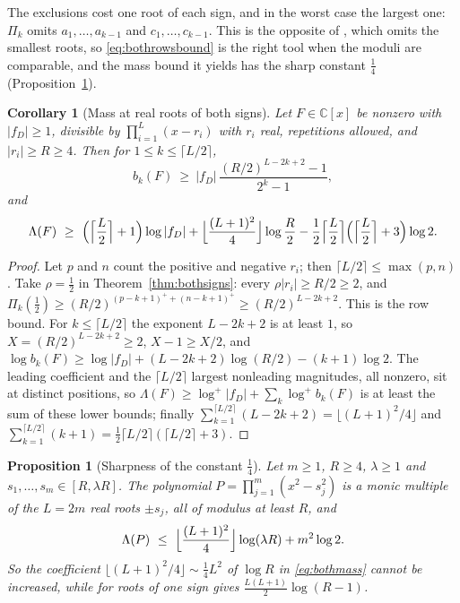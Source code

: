 \documentclass[11pt]{article}
\newtheorem{corollary}[theorem]{Corollary}
\newtheorem{proposition}[theorem]{Proposition}
\begin{document}
The exclusions cost one root of each sign, and in the worst case the largest
one: $\Pi_k$ omits $a_1,\ldots,a_{k-1}$ and $c_1,\ldots,c_{k-1}$.  This is the
opposite of \cite[Theorem~3.2]{coefficient-mass}, which omits the smallest roots, so
\eqref{eq:bothrowsbound} is the right tool when the moduli are comparable,
and the mass bound it yields has the sharp constant $\frac14$
(Proposition~\ref{prop:bothsignssharp}).

\begin{corollary}[Mass at real roots of both signs]\label{cor:bothsignsmass}
Let $F\in\mathbb C[x]$ be nonzero with $|f_D|\ge1$, divisible by
$\prod_{i=1}^L(x-r_i)$ with $r_i$ real, repetitions allowed, and $|r_i|\ge R\ge4$.
Then for $1\le k\le\lceil L/2\rceil$,
\[
  b_k(F)\ \ge\ |f_D|\,\frac{(R/2)^{L-2k+2}-1}{2^k-1},
\]
and
\begin{equation}\label{eq:bothmass}
  \Lambda(F)\ \ge\ \Bigl(\Bigl\lceil\frac L2\Bigr\rceil+1\Bigr)\log|f_D|
  +\Bigl\lfloor\frac{(L+1)^2}4\Bigr\rfloor\log\frac R2
  -\frac12\Bigl\lceil\frac L2\Bigr\rceil\Bigl(\Bigl\lceil\frac L2\Bigr\rceil+3\Bigr)\log2 .
\end{equation}
\end{corollary}

\begin{proof}
Let $p$ and $n$ count the positive and negative $r_i$; then
$\lceil L/2\rceil\le\max(p,n)$.  Take $\rho=\frac12$ in
Theorem~\ref{thm:bothsigns}: every $\rho|r_i|\ge R/2\ge2$, and
$\Pi_k(\tfrac12)\ge(R/2)^{(p-k+1)^++(n-k+1)^+}\ge(R/2)^{L-2k+2}$.  This is the row
bound.  For $k\le\lceil L/2\rceil$ the exponent $L-2k+2$ is at least $1$, so
$X=(R/2)^{L-2k+2}\ge2$, $X-1\ge X/2$, and
$\log b_k(F)\ge\log|f_D|+(L-2k+2)\log(R/2)-(k+1)\log2$.  The leading coefficient
and the $\lceil L/2\rceil$ largest nonleading magnitudes, all nonzero, sit at
distinct positions, so $\Lambda(F)\ge\log^+|f_D|+\sum_k\log^+b_k(F)$ is at
least the sum of these lower bounds; finally
$\sum_{k=1}^{\lceil L/2\rceil}(L-2k+2)=\lfloor(L+1)^2/4\rfloor$ and
$\sum_{k=1}^{\lceil L/2\rceil}(k+1)=\frac12\lceil L/2\rceil(\lceil L/2\rceil+3)$.
\end{proof}

\begin{proposition}[Sharpness of the constant $\frac14$]\label{prop:bothsignssharp}
Let $m\ge1$, $R\ge4$, $\lambda\ge1$ and $s_1,\ldots,s_m\in[R,\lambda R]$.  The
polynomial $P=\prod_{j=1}^m(x^2-s_j^2)$ is a monic multiple of the $L=2m$ real
roots $\pm s_j$, all of modulus at least $R$, and
\[
  \Lambda(P)\ \le\ \Bigl\lfloor\frac{(L+1)^2}4\Bigr\rfloor\log(\lambda R)+m^2\log2 .
\]
So the coefficient $\lfloor(L+1)^2/4\rfloor\sim\frac14L^2$ of $\log R$ in
\eqref{eq:bothmass} cannot be increased, while for roots of one sign
\cite[Corollary~3.4]{coefficient-mass} gives $\frac{L(L+1)}2\log(R-1)$.
\end{proposition}
\end{document}
